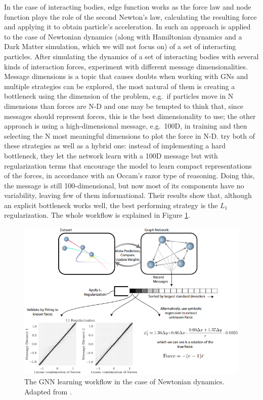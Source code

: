 \documentclass[../../master_thesis_np.tex]{subfiles}
\begin{document}
	In the case of interacting bodies, edge function works as the force law and node function plays the role of the second Newton's law, calculating the resulting force and applying it to obtain particle's acceleration. 
	In \cite{cranmer_discovering_2020} such an approach is applied to the case of Newtonian dynamics (along with Hamiltonian dynamics and a Dark Matter simulation, which we will not focus on) of a set of interacting particles. 
	After simulating the dynamics of a set of interacting bodies with several kinds of interaction forces, \citeauthor{cranmer_discovering_2020} experiment with different message dimensionalities. 
	Message dimensions is a topic that causes doubts when working with GNs and multiple strategies can be explored, the most natural of them is creating a bottleneck using the dimension of the problem, e.g.~if particles move in N dimensions than forces are N-D and one may be tempted to think that, since messages should represent forces, this is the best dimensionality to use; the other approach is using a high-dimensional message, e.g.~100D, in training and then selecting the N most meaningful dimensions to plot the force in N-D. 
	\citeauthor{cranmer_discovering_2020} try both of these strategies as well as a hybrid one: instead of implementing a hard bottleneck, they let the network learn with a 100D message but with regularization terms that encourage the model to learn compact representations of the forces, in accordance with an Occam's razor type of reasoning. 
	Doing this, the message is still 100-dimensional, but now most of its components have no variability, leaving few of them informational. 
	Their results show that, although an explicit bottleneck works well, the best performing strategy is the $L_1$ regularization. 
	The whole workflow is explained in Figure \ref{fig:cranmer1}.
	
	 \begin{figure}[htp]
		\centering
		\includegraphics[width=\singfigwidth]{cranmer1.png}
		\caption{The GNN learning workflow in the case of Newtonian dynamics. Adapted from \cite{cranmer_discovering_2020}.}
		\label{fig:cranmer1}
	\end{figure}
	
\end{document}
